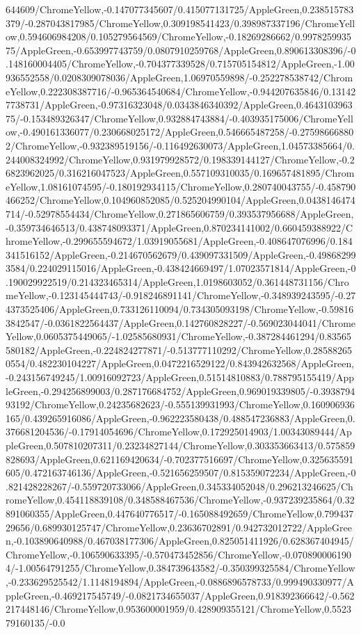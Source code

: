 {\begin{tikzternal}
644609/ChromeYellow,-0.147077345607/0.415077131725/AppleGreen,0.238515783379/-0.287043817985/ChromeYellow,0.309198541423/0.398987337196/ChromeYellow,0.594606984208/0.105279564569/ChromeYellow,-0.18269286662/0.997825993575/AppleGreen,-0.653997743759/0.0807910259768/AppleGreen,0.890613308396/-0.148160004405/ChromeYellow,-0.704377339528/0.715705154812/AppleGreen,-1.00936552558/0.0208309078036/AppleGreen,1.06970559898/-0.252278538742/ChromeYellow,0.222308387716/-0.965364540684/ChromeYellow,-0.944207635846/0.131427738731/AppleGreen,-0.97316323048/0.0343846340392/AppleGreen,0.464310396375/-0.153489326347/ChromeYellow,0.932884743884/-0.403935175006/ChromeYellow,-0.490161336077/0.230668025172/AppleGreen,0.546665487258/-0.275986668802/ChromeYellow,-0.932389519156/-0.116492630073/AppleGreen,1.04573385664/0.244008324992/ChromeYellow,0.931979928572/0.198339144127/ChromeYellow,-0.26823962025/0.316216047523/AppleGreen,0.557109310035/0.169657481895/ChromeYellow,1.08161074595/-0.180192934115/ChromeYellow,0.280740043755/-0.458790466252/ChromeYellow,0.104960852085/0.525204990104/AppleGreen,0.0438146474714/-0.52978554434/ChromeYellow,0.271865606759/0.393537956688/AppleGreen,-0.359734646513/0.438748093371/AppleGreen,0.870234141002/0.660459388922/ChromeYellow,-0.299655594672/1.03919055681/AppleGreen,-0.408647076996/0.184341516152/AppleGreen,-0.214670562679/0.439097331509/AppleGreen,-0.498682993584/0.224029115016/AppleGreen,-0.438424669497/1.07023571814/AppleGreen,-0.190029922519/0.214323465314/AppleGreen,1.0198603052/0.361448731156/ChromeYellow,-0.123145444743/-0.918246891141/ChromeYellow,-0.348939243595/-0.274373525406/AppleGreen,0.733126110094/0.734305093198/ChromeYellow,-0.598163842547/-0.0361822564437/AppleGreen,0.142760828227/-0.569023044041/ChromeYellow,0.0605375449065/-1.02585680931/ChromeYellow,-0.387284461294/0.83565580182/AppleGreen,-0.224824277871/-0.513777110292/ChromeYellow,0.285882650554/0.482230104227/AppleGreen,0.0472216529122/0.843942632568/AppleGreen,-0.243156749245/1.00916092723/AppleGreen,0.51514810883/0.788795155419/AppleGreen,-0.294256899003/0.287176684752/AppleGreen,0.969019339805/-0.393879493192/ChromeYellow,0.24235682623/-0.555139931993/ChromeYellow,0.160906936165/0.439265916086/AppleGreen,-0.962223580438/0.488547236883/AppleGreen,0.376681204536/-0.17914054696/ChromeYellow,0.172925014903/1.00343089444/AppleGreen,0.507810207311/0.23234827144/ChromeYellow,0.303353663413/0.575859828693/AppleGreen,0.621169420634/-0.702377516697/ChromeYellow,0.325635591605/0.472163746136/AppleGreen,-0.521656259507/0.815359072234/AppleGreen,-0.821428228267/-0.559720733066/AppleGreen,0.345334052048/0.296213246625/ChromeYellow,0.454118839108/0.348588467536/ChromeYellow,-0.937239235864/0.32891060355/AppleGreen,0.447640776517/-0.165088492659/ChromeYellow,0.79943729656/0.689930125747/ChromeYellow,0.23636702891/0.942732012722/AppleGreen,-0.103890640988/0.467038177306/AppleGreen,0.825051411926/0.628367404945/ChromeYellow,-0.106590633395/-0.570473452856/ChromeYellow,-0.0708900061904/-1.00564791255/ChromeYellow,0.384739643582/-0.350399325584/ChromeYellow,-0.233629525542/1.1148194894/AppleGreen,-0.0886896578733/0.999490330977/AppleGreen,-0.469217545749/-0.0821734655037/AppleGreen,0.918392366642/-0.562217448146/ChromeYellow,0.953600001959/0.428909355121/ChromeYellow,0.552379160135/-0.0
\end{tikzternal}}
